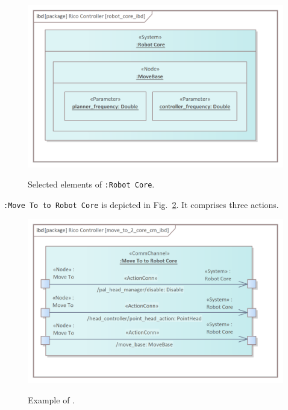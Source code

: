 \documentclass[11pt,oneside,a4paper]{report}
\begin{document}
	\begin{figure}[H]
		\centering
		\begin{center}
			{\includegraphics[scale=.85]{img/rico_pkg/robot_core_ibd.png}}
		\end{center}
		\caption{Selected elements of \stSystem{} \texttt{:Robot Core}.} 
		\label{fig:robot_core_ibd}
	\end{figure}
				
	\stCommChannel{} \texttt{:Move To to Robot Core} is depicted in Fig.~\ref{fig:move_to_2_core_cm_ibd}. It comprises three actions.
	

	\begin{figure}[H]
		\centering
		\begin{center}
			{\includegraphics[scale=1.1]{img/rico_pkg/move_to_2_core_cm_ibd.png}}
		\end{center}
		\caption{Example of \stCommChannel{}.} 
		\label{fig:move_to_2_core_cm_ibd}
	\end{figure}
	
\end{document}
